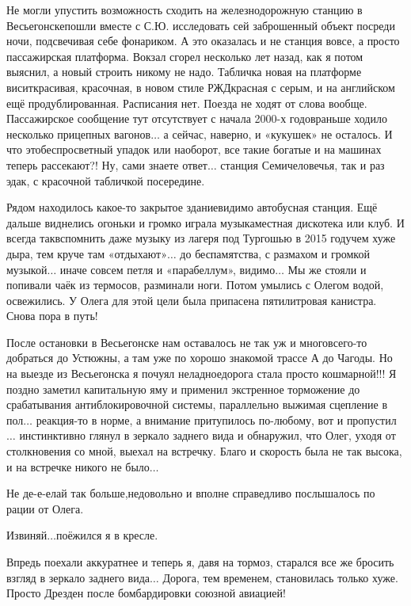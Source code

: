 Не могли упустить возможность сходить на железнодорожную станцию в Весьегонске\mdash пошли вместе с С.Ю. исследовать сей заброшенный объект посреди ночи, подсвечивая себе фонариком. А это оказалась и не станция вовсе, а просто пассажирская платформа. Вокзал сгорел несколько лет назад, как я потом выяснил, а новый строить никому не надо. Табличка новая на платформе висит\mdash красивая, красочная, в новом стиле РЖД\mdash красная с серым, и на английском ещё продублированная. Расписания нет. Поезда не ходят от слова вообще. Пассажирское сообщение тут отсутствует с начала 2000-х годов\mdash раньше ходило несколько прицепных вагонов$\ldots$ а сейчас, наверно, и «кукушек» не осталось. И что это\mdash беспросветный упадок или наоборот, все такие богатые и на машинах теперь рассекают?! Ну, сами знаете ответ$\ldots$ станция Семичеловечья, так и раз эдак, с красочной табличкой посередине.

Рядом находилось какое-то закрытое здание\mdash видимо автобусная станция. Ещё дальше виднелись огоньки и громко играла музыка\mdash местная дискотека или клуб. И всегда так\mdash вспомнить даже музыку из лагеря под Тургошью в 2015 году\mdash чем хуже дыра, тем круче там «отдыхают»$\ldots$ до беспамятства, с размахом и громкой музыкой$\ldots$ иначе совсем петля и «парабеллум», видимо$\ldots$ Мы же стояли и попивали чаёк из термосов, разминали ноги. Потом умылись с Олегом водой, освежились. У Олега для этой цели была припасена пятилитровая канистра. Снова пора в путь!

После остановки в Весьегонске нам оставалось не так уж и много\mdash всего-то добраться до Устюжны, а там уже по хорошо знакомой трассе А до Чагоды. Но на выезде из Весьегонска я почуял неладное\mdash дорога стала просто кошмарной!!! Я поздно заметил капитальную яму и применил экстренное торможение до срабатывания антиблокировочной системы, параллельно выжимая сцепление в пол$\ldots$ реакция-то в норме, а внимание притупилось по-любому, вот и пропустил$\ldots$ инстинктивно глянул в зеркало заднего вида и обнаружил, что Олег, уходя от столкновения со мной, выехал на встречку. Благо и скорость была не так высока, и на встречке никого не было$\ldots$ 

\diagdash Не де-е-елай так больше,\mdash недовольно и вполне справедливо послышалось по рации от Олега. 

\diagdash Извиняй$\ldots$\mdash поёжился я в кресле.

Впредь поехали аккуратнее и теперь я, давя на тормоз, старался все же бросить взгляд в зеркало заднего вида$\ldots$ Дорога, тем временем, становилась только хуже. Просто Дрезден после бомбардировки союзной авиацией! 

